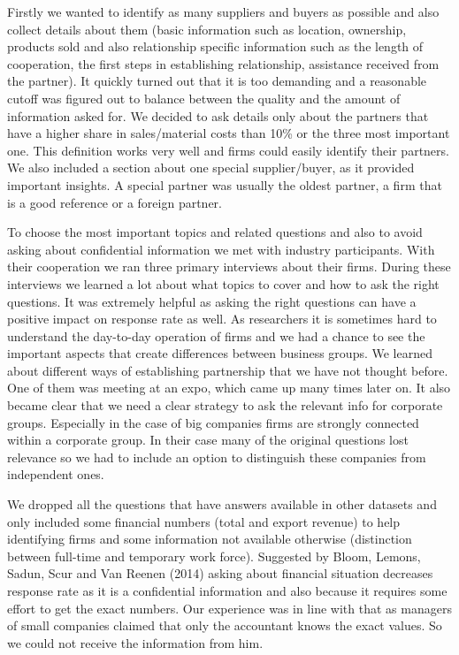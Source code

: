 \documentclass[final, dvipsnames, authoryear,12pt]{elsarticle}
\begin{document}
Firstly we wanted to identify as many suppliers and buyers as possible and also collect details about them (basic information such as location, ownership, products sold and also relationship specific information such as the length of cooperation, the first steps in establishing relationship, assistance received from the partner). It quickly turned out that it is too demanding and a reasonable cutoff was figured out to balance between the quality and the amount of information asked for. We decided to ask details only about the partners that have a higher share in sales/material costs than 10\% or the three most important one. This definition works very well and firms could easily identify their partners. We also included a section about one special supplier/buyer, as it provided important insights. A special partner was usually the oldest partner, a firm that is a good reference or a foreign partner.

To choose the most important topics and related questions and also to avoid asking about confidential information we met with industry participants. With their cooperation we ran three primary interviews about their firms. During these interviews we learned a lot about what topics to cover and how to ask the right questions. It was extremely helpful as asking the right questions can have a positive impact on response rate as well. As researchers it is sometimes hard to understand the day-to-day operation of firms and we had a chance to see the important aspects that create differences between business groups. We learned about different ways of establishing partnership that we have not thought before. One of them was meeting at an expo, which came up many times later on. It also became clear that we need a clear strategy to ask the relevant info for corporate groups. Especially in the case of big companies firms are strongly connected within a corporate group. In their case many of the original questions lost relevance so we had to include an option to distinguish these companies from independent ones.

We dropped all the questions that have answers available in other datasets and only included some financial numbers (total and export revenue) to help identifying firms and some information not available otherwise (distinction between full-time and temporary work force). Suggested by Bloom, Lemons, Sadun, Scur and Van Reenen (2014) asking about financial situation decreases response rate as it is a confidential information and also because it requires some effort to get the exact numbers. Our experience was in line with that as managers of small companies claimed that only the accountant knows the exact values. So we could not receive the information from him.
\end{document}
